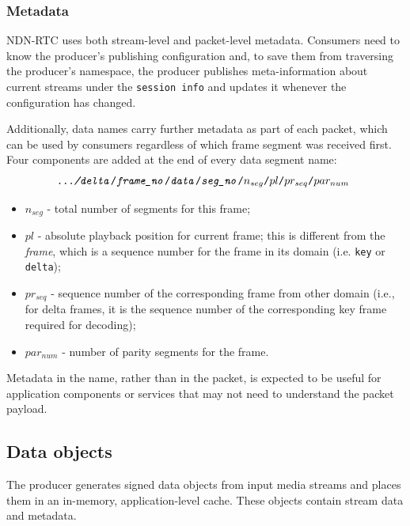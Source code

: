 \documentclass{icn/sig-alternate-2013} %
\newcommand{\ndnrtcName}{NDN-RTC} %
\begin{document}
\subsubsection{Metadata} 

\ndnrtcName{} uses both stream-level and packet-level metadata. 
Consumers need to know the producer's publishing configuration and, to save them from traversing the producer's namespace, the producer publishes meta-information about current streams under the \texttt{session info} and updates it whenever the configuration has changed.

Additionally, data names carry further metadata as part of each packet, which can be used by consumers regardless of which frame segment was received first. 
Four components are added at the end of every data segment name:
\small\begin{equation}
\texttt{\textit{.../delta}/\textit{frame\_no}/\textit{data}/\textit{seg\_no}/\textbf{$n_{seg}$}/\textbf{$pl$}/\textbf{$pr_{seq}$}/\textbf{$par_{num}$} \nonumber}
\end{equation}\normalsize
\begin{itemize}[label={}]
\item \texttt{$n_{seg}$} - total number of segments for this frame;
\item \texttt{$pl$} - absolute playback position for current frame; this is different from the \textit{frame}, which is a sequence number for the frame in its domain (i.e. \texttt{key} or \texttt{delta});
\item \texttt{$pr_{seq}$} - sequence number of the corresponding frame from other domain (i.e., for delta frames, it is the sequence number of the corresponding key frame required for decoding);
\item \texttt{$par_{num}$} - number of parity segments for the frame.
\end{itemize}
Metadata in the name, rather than in the packet, is expected to be useful for application components or services that may not need to understand the packet payload. 

\subsection{Data objects}
The producer generates signed data objects from input media streams and places them in an in-memory, application-level cache.  These objects contain stream data and metadata.
\end{document}
